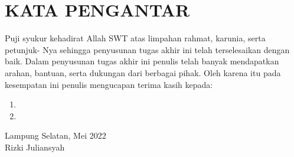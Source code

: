 \chapter*{KATA PENGANTAR}

\begin{justify}
\noindent Puji syukur kehadirat Allah SWT atas limpahan rahmat, karunia, serta petunjuk- Nya sehingga penyusunan tugas akhir ini telah terselesaikan dengan baik. Dalam penyusunan tugas akhir ini penulis telah banyak mendapatkan arahan, bantuan, serta dukungan dari berbagai pihak. Oleh karena itu pada kesempatan ini penulis mengucapan terima kasih kepada:
\begin{enumerate}
	\item  
	\item 
\end{enumerate}
\vspace{2cm}
\end{justify}
\hfill
\begin{minipage}[t]{4.9cm}
\centering
	Lampung Selatan, \hspace{2cm} Mei 2022 \\ [2cm]
	Rizki Juliansyah
\end{minipage}

\newpage